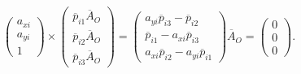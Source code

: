 \documentclass[14pt, a4paper]{extarticle}
\begin{document}
\begin{equation}
    \begin{pmatrix}
        a_{xi}\\
        a_{yi}\\
        1
    \end{pmatrix} \times \begin{pmatrix}
        \overline{p}_{i1} \overline{A}_O\\
        \overline{p}_{i2} \overline{A}_O\\
        \overline{p}_{i3} \overline{A}_O
    \end{pmatrix} = \begin{pmatrix}
        a_{yi} \overline{p}_{i3} - \overline{p}_{i2} \\
        \overline{p}_{i1} - a_{xi} \overline{p}_{i3} \\
        a_{xi} \overline{p}_{i2} - a_{yi} \overline{p}_{i1}
    \end{pmatrix} \overline{A}_O = \begin{pmatrix}
        0\\
        0\\
        0
    \end{pmatrix}.
\label{eqn:cross_product_one_camera}
\end{equation}
\end{document}
